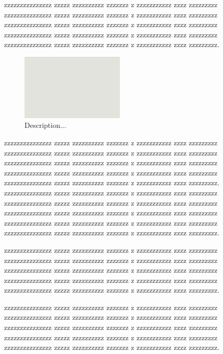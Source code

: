 \documentclass[prl,twocolumn]{revtex4-1}
\begin{document}
  

  zzzzzzzzzzzzzzz zzzzz zzzzzzzzzz zzzzzzz z zzzzzzzzzzz zzzz zzzzzzzzz
  zzzzzzzzzzzzzzz zzzzz zzzzzzzzzz zzzzzzz z zzzzzzzzzzz zzzz zzzzzzzzz
  zzzzzzzzzzzzzzz zzzzz zzzzzzzzzz zzzzzzz z zzzzzzzzzzz zzzz zzzzzzzzz
  zzzzzzzzzzzzzzz zzzzz zzzzzzzzzz zzzzzzz z zzzzzzzzzzz zzzz zzzzzzzzz
  zzzzzzzzzzzzzzz zzzzz zzzzzzzzzz zzzzzzz z zzzzzzzzzzz zzzz zzzzzzzzz.
  
\begin{figure}[!tb]
  \includegraphics[width=0.44\textwidth]{fig1a.png}
  \caption{Description...}
  \label{fig:z}
\end{figure}


  zzzzzzzzzzzzzzz zzzzz zzzzzzzzzz zzzzzzz z zzzzzzzzzzz zzzz zzzzzzzzz
  zzzzzzzzzzzzzzz zzzzz zzzzzzzzzz zzzzzzz z zzzzzzzzzzz zzzz zzzzzzzzz
  zzzzzzzzzzzzzzz zzzzz zzzzzzzzzz zzzzzzz z zzzzzzzzzzz zzzz zzzzzzzzz
  zzzzzzzzzzzzzzz zzzzz zzzzzzzzzz zzzzzzz z zzzzzzzzzzz zzzz zzzzzzzzz
  zzzzzzzzzzzzzzz zzzzz zzzzzzzzzz zzzzzzz z zzzzzzzzzzz zzzz zzzzzzzzz.
  zzzzzzzzzzzzzzz zzzzz zzzzzzzzzz zzzzzzz z zzzzzzzzzzz zzzz zzzzzzzzz
  zzzzzzzzzzzzzzz zzzzz zzzzzzzzzz zzzzzzz z zzzzzzzzzzz zzzz zzzzzzzzz
  zzzzzzzzzzzzzzz zzzzz zzzzzzzzzz zzzzzzz z zzzzzzzzzzz zzzz zzzzzzzzz
  zzzzzzzzzzzzzzz zzzzz zzzzzzzzzz zzzzzzz z zzzzzzzzzzz zzzz zzzzzzzzz
  zzzzzzzzzzzzzzz zzzzz zzzzzzzzzz zzzzzzz z zzzzzzzzzzz zzzz zzzzzzzzz.
  
  zzzzzzzzzzzzzzz zzzzz zzzzzzzzzz zzzzzzz z zzzzzzzzzzz zzzz zzzzzzzzz
  zzzzzzzzzzzzzzz zzzzz zzzzzzzzzz zzzzzzz z zzzzzzzzzzz zzzz zzzzzzzzz
  zzzzzzzzzzzzzzz zzzzz zzzzzzzzzz zzzzzzz z zzzzzzzzzzz zzzz zzzzzzzzz
  zzzzzzzzzzzzzzz zzzzz zzzzzzzzzz zzzzzzz z zzzzzzzzzzz zzzz zzzzzzzzz
  zzzzzzzzzzzzzzz zzzzz zzzzzzzzzz zzzzzzz z zzzzzzzzzzz zzzz zzzzzzzzz.

  


  zzzzzzzzzzzzzzz zzzzz zzzzzzzzzz zzzzzzz z zzzzzzzzzzz zzzz zzzzzzzzz
  zzzzzzzzzzzzzzz zzzzz zzzzzzzzzz zzzzzzz z zzzzzzzzzzz zzzz zzzzzzzzz
  zzzzzzzzzzzzzzz zzzzz zzzzzzzzzz zzzzzzz z zzzzzzzzzzz zzzz zzzzzzzzz
  zzzzzzzzzzzzzzz zzzzz zzzzzzzzzz zzzzzzz z zzzzzzzzzzz zzzz zzzzzzzzz
  zzzzzzzzzzzzzzz zzzzz zzzzzzzzzz zzzzzzz z zzzzzzzzzzz zzzz zzzzzzzzz.
\end{document}
